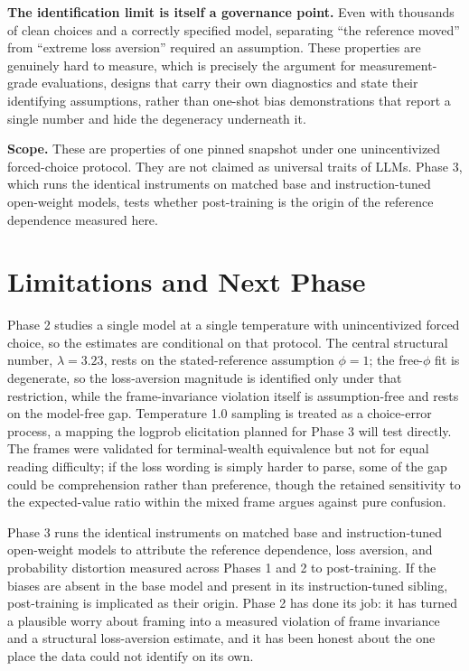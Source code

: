 \documentclass[11pt]{article}
\begin{document}
\textbf{The identification limit is itself a governance point.} Even with thousands of clean choices and
a correctly specified model, separating ``the reference moved'' from ``extreme loss aversion'' required an
assumption. These properties are genuinely hard to measure, which is precisely the argument for
measurement-grade evaluations, designs that carry their own diagnostics and state their identifying
assumptions, rather than one-shot bias demonstrations that report a single number and hide the
degeneracy underneath it.

\textbf{Scope.} These are properties of one pinned snapshot under one unincentivized forced-choice
protocol. They are not claimed as universal traits of LLMs. Phase 3, which runs the identical instruments
on matched base and instruction-tuned open-weight models, tests whether post-training is the origin of
the reference dependence measured here.

\section{Limitations and Next Phase}

Phase 2 studies a single model at a single temperature with unincentivized forced choice, so the
estimates are conditional on that protocol. The central structural number, $\lambda = 3.23$, rests on the
stated-reference assumption $\phi = 1$; the free-$\phi$ fit is degenerate, so the loss-aversion magnitude
is identified only under that restriction, while the frame-invariance violation itself is assumption-free
and rests on the model-free gap. Temperature 1.0 sampling is treated as a choice-error process, a mapping
the logprob elicitation planned for Phase 3 will test directly. The frames were validated for
terminal-wealth equivalence but not for equal reading difficulty; if the loss wording is simply harder to
parse, some of the gap could be comprehension rather than preference, though the retained sensitivity to
the expected-value ratio within the mixed frame argues against pure confusion.

Phase 3 runs the identical instruments on matched base and instruction-tuned open-weight models to
attribute the reference dependence, loss aversion, and probability distortion measured across Phases 1
and 2 to post-training. If the biases are absent in the base model and present in its instruction-tuned
sibling, post-training is implicated as their origin. Phase 2 has done its job: it has turned a plausible
worry about framing into a measured violation of frame invariance and a structural loss-aversion estimate,
and it has been honest about the one place the data could not identify on its own.
\end{document}
